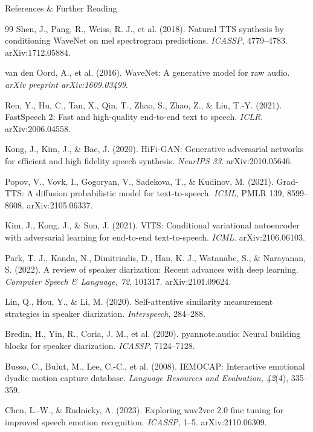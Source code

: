 \begin{frame}[allowframebreaks]{References \& Further Reading}
\begin{thebibliography}{99}
Shen, J., Pang, R., Weiss, R. J., et al. (2018). Natural TTS synthesis by conditioning WaveNet on mel spectrogram predictions. \textit{ICASSP}, 4779--4783. arXiv:1712.05884.

van den Oord, A., et al. (2016). WaveNet: A generative model for raw audio. \textit{arXiv preprint arXiv:1609.03499}.

Ren, Y., Hu, C., Tan, X., Qin, T., Zhao, S., Zhao, Z., \& Liu, T.-Y. (2021). FastSpeech 2: Fast and high-quality end-to-end text to speech. \textit{ICLR}. arXiv:2006.04558.

Kong, J., Kim, J., \& Bae, J. (2020). HiFi-GAN: Generative adversarial networks for efficient and high fidelity speech synthesis. \textit{NeurIPS 33}. arXiv:2010.05646.

Popov, V., Vovk, I., Gogoryan, V., Sadekova, T., \& Kudinov, M. (2021). Grad-TTS: A diffusion probabilistic model for text-to-speech. \textit{ICML}, PMLR 139, 8599--8608. arXiv:2105.06337.

Kim, J., Kong, J., \& Son, J. (2021). VITS: Conditional variational autoencoder with adversarial learning for end-to-end text-to-speech. \textit{ICML}. arXiv:2106.06103.

Park, T. J., Kanda, N., Dimitriadis, D., Han, K. J., Watanabe, S., \& Narayanan, S. (2022). A review of speaker diarization: Recent advances with deep learning. \textit{Computer Speech \& Language, 72}, 101317. arXiv:2101.09624.

Lin, Q., Hou, Y., \& Li, M. (2020). Self-attentive similarity measurement strategies in speaker diarization. \textit{Interspeech}, 284--288.

Bredin, H., Yin, R., Coria, J. M., et al. (2020). pyannote.audio: Neural building blocks for speaker diarization. \textit{ICASSP}, 7124--7128.

Busso, C., Bulut, M., Lee, C.-C., et al. (2008). IEMOCAP: Interactive emotional dyadic motion capture database. \textit{Language Resources and Evaluation, 42}(4), 335--359.

Chen, L.-W., \& Rudnicky, A. (2023). Exploring wav2vec 2.0 fine tuning for improved speech emotion recognition. \textit{ICASSP}, 1--5. arXiv:2110.06309.


\end{thebibliography}
\end{frame}
